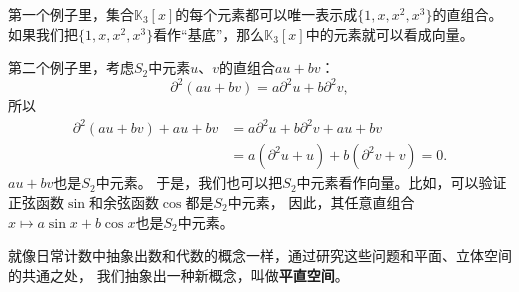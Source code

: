 \documentclass[12pt,UTF8]{ctexbook}
\theoremstyle{definition}
\theoremstyle{plain}
\begin{document}
第一个例子里，集合$\mathbb{K}_3[x]$的每个元素都可以唯一表示成$\{1, x, x^2, x^3\}$的直组合。
如果我们把$\{1, x, x^2, x^3\}$看作“基底”，那么$\mathbb{K}_3[x]$中的元素就可以看成向量。

第二个例子里，考虑$S_2$中元素$u$、$v$的直组合$au + bv$：
$$ \partial^2 (au + bv) = a \partial^2 u + b \partial^2 v,$$
所以
\begin{align*}
    \partial^2 (au + bv) + au + bv &= a \partial^2 u + b \partial^2 v + au + bv  \\
    &= a(\partial^2 u + u) + b(\partial^2 v + v) = 0.  
\end{align*}
$au + bv$也是$S_2$中元素。
于是，我们也可以把$S_2$中元素看作向量。比如，可以验证正弦函数$\sin$和余弦函数$\cos$都是$S_2$中元素，
因此，其任意直组合$x\mapsto a\sin{x} + b\cos{x}$也是$S_2$中元素。

就像日常计数中抽象出数和代数的概念一样，通过研究这些问题和平面、立体空间的共通之处，
我们抽象出一种新概念，叫做\textbf{平直空间}。
\end{document}
